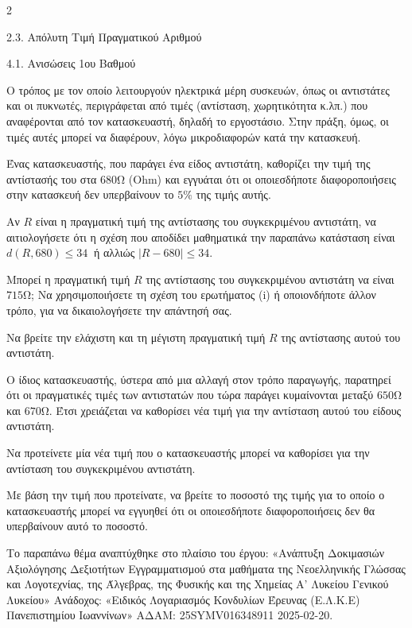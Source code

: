 \begin{ylh}{2}
    \item 2.3. Απόλυτη Τιμή Πραγματικού Αριθμού
    \item 4.1. Ανισώσεις 1ου Βαθμού
\end{ylh}
Ο τρόπος με τον οποίο λειτουργούν ηλεκτρικά μέρη συσκευών, όπως οι αντιστάτες και οι πυκνωτές, περιγράφεται από τιμές (αντίσταση, χωρητικότητα κ.λπ.) που αναφέρονται από τον κατασκευαστή, δηλαδή το εργοστάσιο. Στην πράξη, όμως, οι τιμές αυτές μπορεί να διαφέρουν, λόγω μικροδιαφορών κατά την κατασκευή.

\begin{alist}
\item Ένας κατασκευαστής, που παράγει ένα είδος αντιστάτη, καθορίζει την τιμή της αντίστασής του στα $680$Ω (Ohm) και εγγυάται ότι οι οποιεσδήποτε διαφοροποιήσεις στην κατασκευή δεν υπερβαίνουν το $5\%$ της τιμής αυτής.

\begin{rlist}
\item Αν $R$ είναι η πραγματική τιμή της αντίστασης του συγκεκριμένου αντιστάτη, να αιτιολογήσετε ότι η σχέση που αποδίδει μαθηματικά την παραπάνω κατάσταση είναι $d(R,680) \leq 34\ $ ή αλλιώς $|R - 680| \leq 34$.
\item Μπορεί η πραγματική τιμή $R$ της αντίστασης του συγκεκριμένου αντιστάτη να είναι $715$Ω; Να χρησιμοποιήσετε τη σχέση του ερωτήματος (i) ή οποιονδήποτε άλλον τρόπο, για να δικαιολογήσετε την απάντησή σας.
\item Να βρείτε την ελάχιστη και τη μέγιστη πραγματική τιμή $R$ της αντίστασης αυτού του αντιστάτη.
\end{rlist}
\item Ο ίδιος κατασκευαστής, ύστερα από μια αλλαγή στον τρόπο παραγωγής, παρατηρεί ότι οι πραγματικές τιμές των αντιστατών που τώρα παράγει κυμαίνονται μεταξύ $650$Ω και $670$Ω. Έτσι χρειάζεται να καθορίσει νέα τιμή για την αντίσταση αυτού του είδους αντιστάτη.

\begin{rlist}
\item Να προτείνετε μία νέα τιμή που ο κατασκευαστής μπορεί να καθορίσει για την αντίσταση του συγκεκριμένου αντιστάτη.
\item Με βάση την τιμή που προτείνατε, να βρείτε το ποσοστό της τιμής για το οποίο ο κατασκευαστής μπορεί να εγγυηθεί ότι οι οποιεσδήποτε διαφοροποιήσεις δεν θα υπερβαίνουν αυτό το ποσοστό.

{\footnotesize Το παραπάνω θέμα αναπτύχθηκε στο πλαίσιο του έργου: «Ανάπτυξη Δοκιμασιών Αξιολόγησης Δεξιοτήτων Εγγραμματισμού στα μαθήματα της Νεοελληνικής Γλώσσας και Λογοτεχνίας, της Άλγεβρας, της Φυσικής και της Χημείας Α' Λυκείου Γενικού Λυκείου» Ανάδοχος: «Ειδικός Λογαριασμός Κονδυλίων Έρευνας (Ε.Λ.Κ.Ε) Πανεπιστημίου Ιωαννίνων» ΑΔΑΜ: 25SYMV016348911 2025-02-20.}
\end{rlist}
\end{alist}

